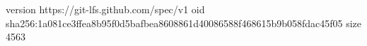 version https://git-lfs.github.com/spec/v1
oid sha256:1a081ce3ffea8b95f0d5bafbea8608861d40086588f468615b9b058fdac45f05
size 4563
